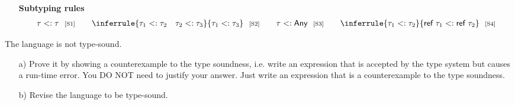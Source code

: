\begin{enumerate}
\begin{itemize}
    \item[] \textbf{Subtyping rules}
\[
  \begin{array}{c@{\hskip20pt}c@{\hskip20pt}c@{\hskip20pt}c}
    \tau<:\tau
    \ \ \text{\scriptsize[S1]}
    &
    \inferrule
    { \tau_1<:\tau_2 \rulesep \tau_2<:\tau_3 }
    { \tau_1<:\tau_3 }
    \ \ \text{\scriptsize[S2]}
    &
    \tau<:\textsf{Any}
    \ \ \text{\scriptsize[S3]}
    &
    \inferrule
    { \tau_1<:\tau_2 }
    { \textsf{ref}\ \tau_1<:\textsf{ref}\ \tau_2 }
    \ \ \text{\scriptsize[S4]}
  \end{array}
\]
\end{itemize}

The language is not type-sound.
\begin{itemize}
  \item[a)] Prove it by showing a counterexample to the
type soundness, i.e. write an expression that is accepted by the type system but
causes a run-time error. You DO NOT need to justify your answer. Just write an
expression that is a counterexample to the type soundness.
  \item[b)] Revise the language to be type-sound.
\end{itemize}


\end{enumerate}
